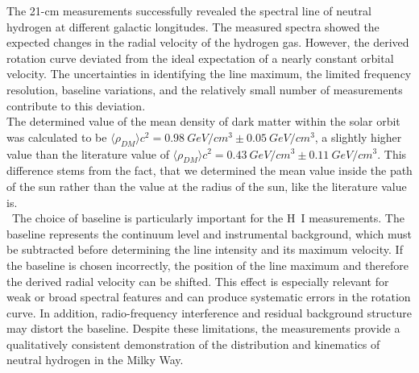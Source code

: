 \documentclass[10pt,a4paper, bibliography=totoc]{scrartcl}
\begin{document}
The 21-cm measurements successfully revealed the spectral line of neutral hydrogen at different galactic longitudes. The measured spectra showed the expected changes in the radial velocity of the hydrogen gas. However, the derived rotation curve deviated from the ideal expectation of a nearly constant orbital velocity. The uncertainties in identifying the line maximum, the limited frequency resolution, baseline variations, and the relatively small number of measurements contribute to this deviation.\\
The determined value of the mean density of dark matter within the solar orbit was calculated to be $\langle\rho_{DM}\rangle c^2 = \qty{0.98}{GeV\per cm^3}\pm\qty{0.05}{GeV\per cm^3}$, a slightly higher value than the literature value of $\langle\rho_{DM}\rangle c^2 = \qty{0.43}{GeV\per cm^3}\pm \qty{0.11}{GeV\per cm^3}$. This difference stems from the fact, that we determined the mean value inside the path of the sun rather than the value at the radius of the sun, like the literature value is.\\\
The choice of baseline is particularly important for the H~I measurements. The baseline represents the continuum level and instrumental background, which must be subtracted before determining the line intensity and its maximum velocity. If the baseline is chosen incorrectly, the position of the line maximum and therefore the derived radial velocity can be shifted. This effect is especially relevant for weak or broad spectral features and can produce systematic errors in the rotation curve. In addition, radio-frequency interference and residual background structure may distort the baseline. Despite these limitations, the measurements provide a qualitatively consistent demonstration of the distribution and kinematics of neutral hydrogen in the Milky Way.

\newpage





\newpage

\listoffigures 
{}

\newpage

\appendix
\end{document}
